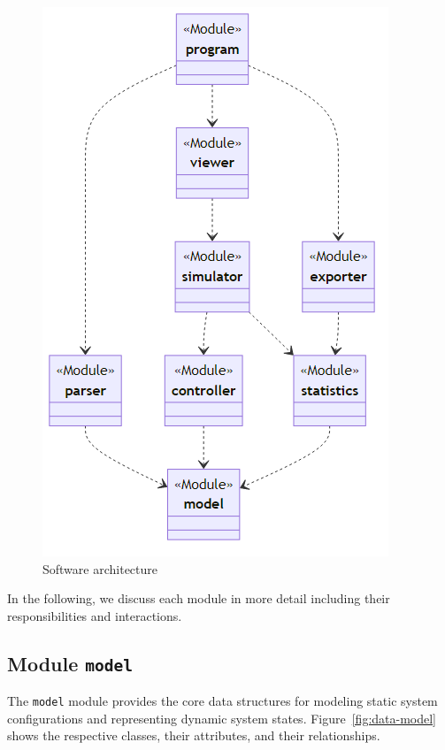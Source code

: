 \documentclass[10pt,twocolumn]{article}
\begin{document}
\begin{figure}[h!]
    \centering
    \includegraphics[scale=0.4]{../../diagrams/architecture-v2.png}
    \caption{Software architecture}
    \label{fig:software-architecture}
\end{figure}

In the following, we discuss each module in more detail including their responsibilities and interactions.

\subsection{Module \texttt{model}}
\label{sec:data-model}

The \texttt{model} module provides the core data structures for modeling static system configurations and representing dynamic system states.
Figure~\ref{fig:data-model} shows the respective classes, their attributes, and their relationships.
\end{document}

